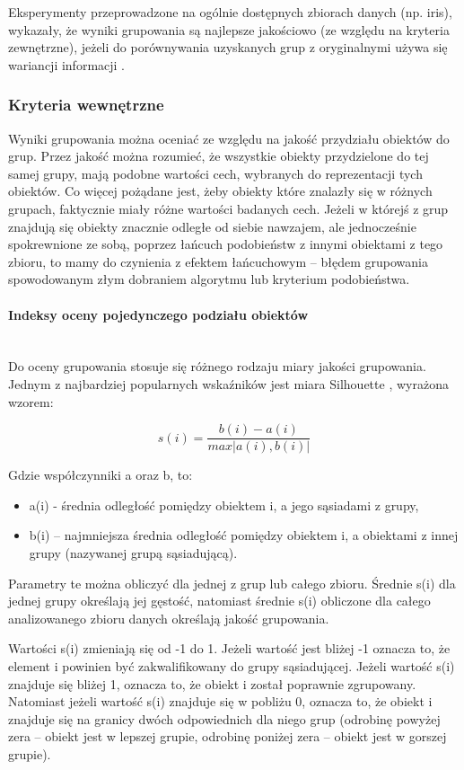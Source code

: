 \documentclass{article}
\newcommand{\myparagraph}[1]{\paragraph{#1}\mbox{}\\}
\begin{document}
Eksperymenty przeprowadzone na ogólnie dostępnych zbiorach danych (np. iris), wykazały, że wyniki grupowania są najlepsze jakościowo (ze względu na kryteria zewnętrzne), jeżeli do porównywania uzyskanych grup z oryginalnymi używa się wariancji informacji \cite{validity_indices}.

\subsubsection{Kryteria wewnętrzne}

Wyniki grupowania można oceniać ze względu na jakość przydziału obiektów do grup. Przez jakość można rozumieć, że wszystkie obiekty przydzielone do tej samej grupy, mają podobne wartości cech, wybranych do reprezentacji tych obiektów. Co więcej pożądane jest, żeby obiekty które znalazły się w różnych grupach, faktycznie miały różne wartości badanych cech. 
Jeżeli w którejś z grup znajdują się obiekty znacznie odległe od siebie nawzajem, ale jednocześnie spokrewnione ze sobą, poprzez łańcuch podobieństw z innymi obiektami z tego zbioru, to mamy do czynienia z efektem łańcuchowym – błędem grupowania spowodowanym złym dobraniem algorytmu lub kryterium podobieństwa.

\myparagraph{Indeksy oceny pojedynczego podziału obiektów}

Do oceny grupowania stosuje się różnego rodzaju miary jakości grupowania. Jednym z najbardziej popularnych wskaźników jest miara Silhouette \cite{silhouette_index}, wyrażona wzorem:

\[s(i) = \frac{b(i) - a(i)}{max|a(i),b(i)|}\]

Gdzie współczynniki a oraz b, to:

\begin{itemize}
	\item a(i) - średnia odległość pomiędzy obiektem i, a jego sąsiadami z grupy,
	\item b(i) – najmniejsza średnia odległość pomiędzy obiektem i, a obiektami z innej grupy (nazywanej grupą sąsiadującą).
\end{itemize}
Parametry te można obliczyć dla jednej z grup lub całego zbioru. Średnie s(i)  dla jednej grupy określają jej gęstość, natomiast średnie s(i) obliczone dla całego analizowanego zbioru danych określają jakość grupowania.

Wartości s(i) zmieniają się od -1 do 1. Jeżeli wartość jest bliżej -1 oznacza to, że element i powinien być zakwalifikowany do grupy sąsiadującej. Jeżeli wartość s(i) znajduje się bliżej 1, oznacza to, że obiekt i został poprawnie zgrupowany. Natomiast jeżeli wartość s(i) znajduje się w pobliżu  0, oznacza to, że obiekt i znajduje się na granicy dwóch odpowiednich dla niego grup (odrobinę powyżej zera – obiekt jest w lepszej grupie, odrobinę poniżej zera – obiekt jest w gorszej grupie).
\end{document}
